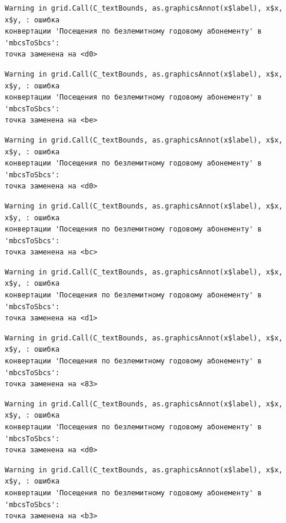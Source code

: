 \documentclass[
  letterpaper,
  DIV=11,
  numbers=noendperiod]{scrreprt}
\begin{document}
\begin{verbatim}
Warning in grid.Call(C_textBounds, as.graphicsAnnot(x$label), x$x, x$y, : ошибка
конвертации 'Посещения по безлемитному годовому абонементу' в 'mbcsToSbcs':
точка заменена на <d0>
\end{verbatim}

\begin{verbatim}
Warning in grid.Call(C_textBounds, as.graphicsAnnot(x$label), x$x, x$y, : ошибка
конвертации 'Посещения по безлемитному годовому абонементу' в 'mbcsToSbcs':
точка заменена на <be>
\end{verbatim}

\begin{verbatim}
Warning in grid.Call(C_textBounds, as.graphicsAnnot(x$label), x$x, x$y, : ошибка
конвертации 'Посещения по безлемитному годовому абонементу' в 'mbcsToSbcs':
точка заменена на <d0>
\end{verbatim}

\begin{verbatim}
Warning in grid.Call(C_textBounds, as.graphicsAnnot(x$label), x$x, x$y, : ошибка
конвертации 'Посещения по безлемитному годовому абонементу' в 'mbcsToSbcs':
точка заменена на <bc>
\end{verbatim}

\begin{verbatim}
Warning in grid.Call(C_textBounds, as.graphicsAnnot(x$label), x$x, x$y, : ошибка
конвертации 'Посещения по безлемитному годовому абонементу' в 'mbcsToSbcs':
точка заменена на <d1>
\end{verbatim}

\begin{verbatim}
Warning in grid.Call(C_textBounds, as.graphicsAnnot(x$label), x$x, x$y, : ошибка
конвертации 'Посещения по безлемитному годовому абонементу' в 'mbcsToSbcs':
точка заменена на <83>
\end{verbatim}

\begin{verbatim}
Warning in grid.Call(C_textBounds, as.graphicsAnnot(x$label), x$x, x$y, : ошибка
конвертации 'Посещения по безлемитному годовому абонементу' в 'mbcsToSbcs':
точка заменена на <d0>
\end{verbatim}

\begin{verbatim}
Warning in grid.Call(C_textBounds, as.graphicsAnnot(x$label), x$x, x$y, : ошибка
конвертации 'Посещения по безлемитному годовому абонементу' в 'mbcsToSbcs':
точка заменена на <b3>
\end{verbatim}
\end{document}
